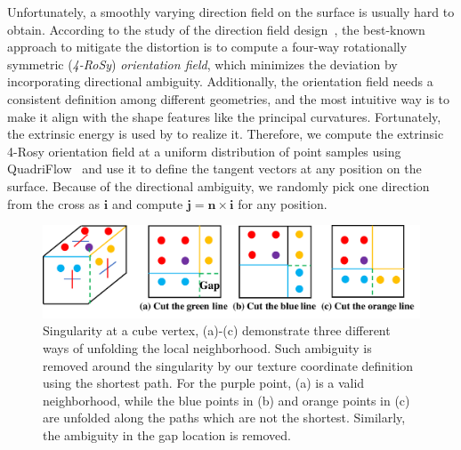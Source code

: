 Unfortunately, a smoothly varying direction field on the surface is usually hard to obtain. According to the study of the direction field design~\cite{ray2008n,lai2010metric}, the best-known approach to mitigate the distortion is to compute a four-way rotationally symmetric (\emph{4-RoSy}) \emph{orientation field}, which minimizes the deviation by incorporating directional ambiguity. Additionally, the orientation field needs a consistent definition among different geometries, and the most intuitive way is to make it align with the shape features like the principal curvatures. Fortunately, the extrinsic energy is used by \cite{jakob2015instant,huang2018quadriflow} to realize it. Therefore, we compute the extrinsic 4-Rosy orientation field at a uniform distribution of point samples using QuadriFlow~\cite{huang2018quadriflow} and use it to define the tangent vectors at any position on the surface. Because of the directional ambiguity, we randomly pick one direction from the cross as $\mathbf{i}$ and compute $\mathbf{j}=\mathbf{n}\times \mathbf{i}$ for any position. 

\begin{figure}
    \centering
    \includegraphics[width=\linewidth]{texturenet/diagram/wrap.pdf}
    \caption{Singularity at a cube vertex, (a)-(c) demonstrate three different ways of unfolding the local neighborhood. Such ambiguity is removed around the singularity by our texture coordinate definition using the shortest path. For the purple point, (a) is a valid neighborhood, while the blue points in (b) and orange points in (c) are unfolded along the paths which are not the shortest. Similarly, the ambiguity in the gap location is removed.}
    \label{fig:texturenet-wrap}
\end{figure}


